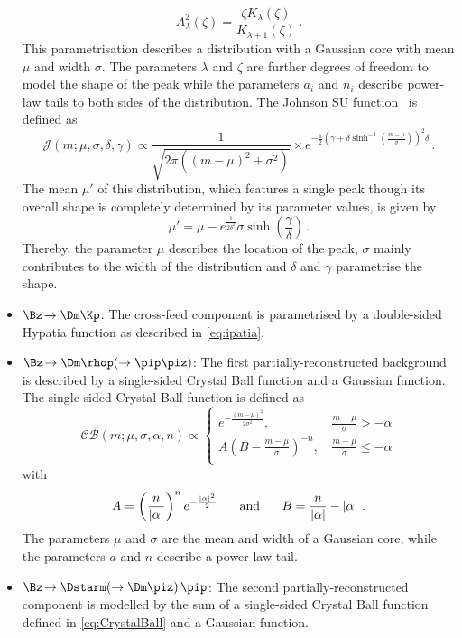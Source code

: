 \begin{itemize}
	\begin{equation}
	A_\lambda^2(\zeta)=\frac{\zeta K_{\lambda}(\zeta)}{K_{\lambda+1}(\zeta)}\,.
	\end{equation}
	This parametrisation describes a distribution with a Gaussian core with mean $\mu$ and width $\sigma$.
	The parameters $\lambda$ and $\zeta$ are further degrees of freedom to model the shape of the peak while the parameters $a_i$ and $n_i$ describe power-law tails to both sides of the distribution.
	The Johnson SU function~\cite{JohnsonSU} is defined as
	\begin{equation}
	\mathcal{J}\!\left(m;\mu,\sigma,\delta,\gamma\right)\propto\frac{1}{\sqrt{2\pi\left(\left(m-\mu\right)^2+\sigma^2\right)}}\times e^{-\frac{1}{2}\left(\gamma+\delta\sinh^{-1}\!\left(\frac{m-\mu}{\sigma}\right)\right)^2\delta}\,.
	\end{equation}
	The mean $\mu'$ of this distribution, which features a single peak though its overall shape is completely determined by its parameter values, is given by
	\begin{equation}
	\mu'=\mu-e^{\frac{1}{2\delta^2}}\sigma\sinh\!\left(\frac{\gamma}{\delta}\right)\,.
	\end{equation}
	Thereby, the parameter $\mu$ describes the location of the peak, $\sigma$ mainly contributes to the width of the distribution and $\delta$ and $\gamma$ parametrise the shape.
	\item $\Bz\!\to\Dm\Kp$: The cross-feed component is parametrised by a double-sided Hypatia function as described in \cref{eq:ipatia}.
	\item $\Bz\!\to\Dm\rhop\!\left(\to\pip\piz\right)$: The first partially-reconstructed background is described by a single-sided Crystal Ball function and a Gaussian function.
	The single-sided Crystal Ball function is defined as
	\begin{equation}
	\mathcal{C\!B}\!\left(m;\mu,\sigma,\alpha,n\right)\propto\begin{cases}
	e^{-\frac{(m-\mu)^2}{2\sigma^2}}, &\, \frac{m-\mu}{\sigma}>-\alpha\\
	A\left(B-\frac{m-\mu}{\sigma}\right)^{-n}, &\, \frac{m-\mu}{\sigma}\leq-\alpha\\\end{cases}\label{eq:CrystalBall}
	\end{equation}
	with
	\begin{equation}
	A=\left(\frac{n}{\left|\alpha\right|}\right)^{n}e^{-\frac{\left|\alpha\right|^2}{2}}\hspace{0.5cm}\text{ and }\hspace{0.5cm}B=\frac{n}{\left|\alpha\right|}-\left|\alpha\right|\,.
	\end{equation}
	The parameters $\mu$ and $\sigma$ are the mean and width of a Gaussian core, while the parameters $a$ and $n$ describe a power-law tail.
	\item $\Bz\!\to\Dstarm\!\left(\to\Dm\piz\right)\pip$: The second partially-reconstructed component is modelled by the sum of a single-sided Crystal Ball function defined in \cref{eq:CrystalBall} and a Gaussian function.
\end{itemize}
